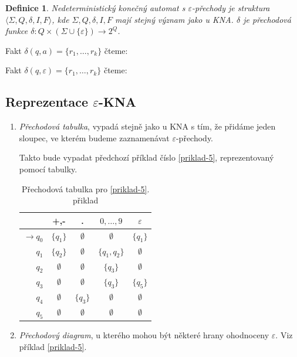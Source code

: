 \documentclass[10pt,a4paper]{article}
\theoremstyle{note}
\newtheorem{definice}{Definice}
\begin{document}
\begin{definice}
Nedeterministický konečný automat s $\varepsilon$-přechody je struktura $ \langle \Sigma,Q,\delta,I,F \rangle $,
kde $\Sigma,Q,\delta,I,F$ mají stejný význam jako u KNA. $\delta$ je přechodová funkce $\delta : Q \times (\Sigma \cup \lbrace \varepsilon \rbrace ) \rightarrow 2^Q$.
\end{definice}

Fakt $\delta (q,a) = \lbrace r_1,\ldots,r_k \rbrace $ čteme: 

Fakt $\delta (q,\varepsilon) = \lbrace r_1,\ldots,r_k \rbrace $ čteme: 

\subsection{Reprezentace $\varepsilon$-KNA}

\begin{enumerate}

\item
\textit{Přechodová tabulka}, vypadá stejně jako u KNA s tím, že přidáme jeden sloupec, ve kterém budeme zaznamenávat $\varepsilon$-přechody.

Takto bude vypadat předchozí př\'iklad číslo \ref{priklad-5}, reprezentovaný pomocí tabulky.

\begin{table}[h]
\begin{center}
\begin{tabular}{ r || c | c | c | c }                   
   & +,- & . & $0,\ldots,9$ & $\varepsilon$ \\
   \hline
   $ \rightarrow q_{0} $ & $ \lbrace q_{1} \rbrace $ & $ \emptyset $ & $ \emptyset $ & $ \lbrace q_{1} \rbrace $\\
   $ q_{1} $ & $ \lbrace q_{2} \rbrace $ & $ \emptyset $ & $ \lbrace q_{1},q_{2} \rbrace $ & $\emptyset$ \\
   $ q_{2} $ & $ \emptyset $ & $ \emptyset $ & $\lbrace q_{3} \rbrace$ & $ \emptyset $ \\
   $ q_{3} $ & $ \emptyset $ & $ \emptyset $ & $\lbrace q_{3} \rbrace$ & $\lbrace q_{5} \rbrace$ \\
   $ q_{4} $ & $ \emptyset $ & $\lbrace q_{3} \rbrace$ & $\emptyset$ & $ \emptyset $ \\
   $ q_{5} $ & $ \emptyset $ &  $ \emptyset $ & $\emptyset$ & $ \emptyset $ 
\end{tabular}
\end{center}
\caption{Přechodov\'a tabulka pro \ref{priklad-5}. přiklad}
\end{table}

\item
\textit{Přechodový diagram}, u kterého mohou být některé hrany ohodnoceny $\varepsilon$. Viz příklad \ref{priklad-5}.

\end{enumerate}
\end{document}
